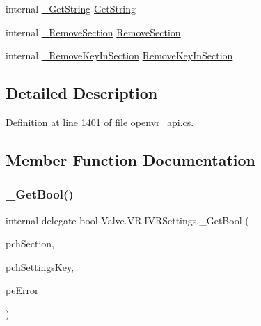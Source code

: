 \begin{DoxyCompactItemize}
\item 
internal \mbox{\hyperlink{struct_valve_1_1_v_r_1_1_i_v_r_settings_a5e71f8b4740ba05ea4fa424674adefbb}{\+\_\+\+Get\+String}} \mbox{\hyperlink{struct_valve_1_1_v_r_1_1_i_v_r_settings_a2d735b829971971837e75851095c7ccd}{Get\+String}}
\item 
internal \mbox{\hyperlink{struct_valve_1_1_v_r_1_1_i_v_r_settings_a1bff5a9ce11b6a9f192cc9d9d34fbcfc}{\+\_\+\+Remove\+Section}} \mbox{\hyperlink{struct_valve_1_1_v_r_1_1_i_v_r_settings_adf937cedc2d8789bc171b687f31ae51b}{Remove\+Section}}
\item 
internal \mbox{\hyperlink{struct_valve_1_1_v_r_1_1_i_v_r_settings_ae4d9e9b9f88da0eeb2887610e1c5ff89}{\+\_\+\+Remove\+Key\+In\+Section}} \mbox{\hyperlink{struct_valve_1_1_v_r_1_1_i_v_r_settings_aa3dc004adcefa359f9362127f08de95d}{Remove\+Key\+In\+Section}}
\end{DoxyCompactItemize}


\subsection{Detailed Description}


Definition at line 1401 of file openvr\+\_\+api.\+cs.



\subsection{Member Function Documentation}
\mbox{\label{struct_valve_1_1_v_r_1_1_i_v_r_settings_abaf963d85e971362f843cd98503893c6}} 
\subsubsection{\texorpdfstring{\_GetBool()}{\_GetBool()}}
{\footnotesize\ttfamily internal delegate bool Valve.\+V\+R.\+I\+V\+R\+Settings.\+\_\+\+Get\+Bool (\begin{DoxyParamCaption}\item[{string}]{pch\+Section,  }\item[{string}]{pch\+Settings\+Key,  }\item[{ref \mbox{\hyperlink{namespace_valve_1_1_v_r_aeab7722b211afc3885ed77faa931291f}{E\+V\+R\+Settings\+Error}}}]{pe\+Error }\end{DoxyParamCaption})}

